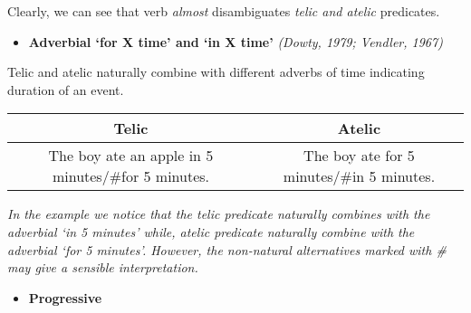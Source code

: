 \documentclass[11pt]{article}
\providecommand{\tightlist}{%
      \setlength{\itemsep}{0pt}\setlength{\parskip}{0pt}}
\begin{document}
Clearly, we can see that verb \emph{almost} disambiguates \emph{telic
and atelic} predicates.

    \begin{itemize}
\tightlist
\item
  \textbf{Adverbial `for X time' and `in X time'} \emph{(Dowty, 1979;
  Vendler, 1967)}
\end{itemize}

Telic and atelic naturally combine with different adverbs of time
indicating duration of an event.

\begin{longtable}[]{@{}cc@{}}
\toprule
\begin{minipage}[b]{0.53\columnwidth}\centering
Telic\strut
\end{minipage} & \begin{minipage}[b]{0.41\columnwidth}\centering
Atelic\strut
\end{minipage}\tabularnewline
\midrule
\endhead
\begin{minipage}[t]{0.53\columnwidth}\centering
The boy ate an apple in 5 minutes/\#for 5 minutes.\strut
\end{minipage} & \begin{minipage}[t]{0.41\columnwidth}\centering
The boy ate for 5 minutes/\#in 5 minutes.\strut
\end{minipage}\tabularnewline
\bottomrule
\end{longtable}

\emph{In the example we notice that the telic predicate naturally
combines with the adverbial `in 5 minutes' while, atelic predicate
naturally combine with the adverbial `for 5 minutes'. However, the
non-natural alternatives marked with \# may give a sensible
interpretation.}

    \begin{itemize}
\tightlist
\item
  \textbf{Progressive}
\end{itemize}
\end{document}
